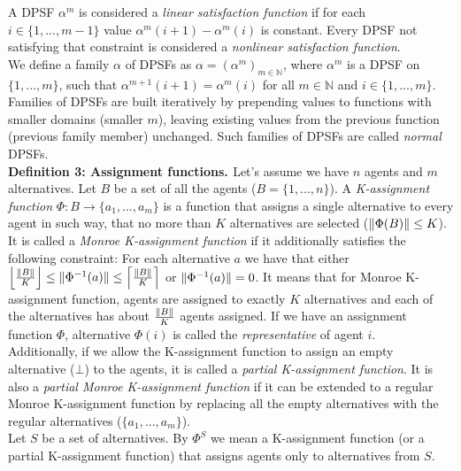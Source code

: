 A DPSF  $\alpha^{m}$ is considered a \textit{linear satisfaction function} if for each $i \in \{1,...,m-1\}$ value $\alpha^{m}(i+1) - \alpha^{m}(i)$ is constant. Every DPSF not satisfying that constraint is considered a \textit{nonlinear satisfaction function}.
\\

We define a family $\alpha$ of DPSFs as $\alpha = (\alpha^{m})_{m \in \mathbb{N}}$, where $\alpha^{m}$ is a DPSF on $\{1,...,m\}$, such that $\alpha^{m+1}(i+1) = \alpha^{m}(i)$ for all $m \in \mathbb{N}$ and $i \in \{1,...,m\}$. Families of DPSFs are built iteratively by prepending values to functions with smaller domains (smaller $m$), leaving existing values from the previous function (previous family member) unchanged. Such families of DPSFs are called \textit{normal} DPSFs.
\\

\noindent
\textbf{Definition 3: Assignment functions. \cite{1}} \hspace{.1in} Let's assume we have $n$ agents and $m$ alternatives. Let $B$ be a set of all the agents ($B = \{1,...,n\}$). A \textit{K-assignment function} $\Phi: B \rightarrow \{a_{1},...,a_{m}\}$ is a function that assigns a single alternative to every agent in such way, that no more than $K$ alternatives are selected ($\lVert\Phi(B)\rVert \leq K$). It is called a \textit{Monroe K-assignment function} if it additionally satisfies the following constraint: For each alternative $a$ we have that either $\left\lfloor \frac{\lVert B\rVert}{K} \right\rfloor \leq \lVert\Phi^{-1}(a)\rVert \leq \left\lceil \frac{\lVert B\rVert}{K} \right\rceil$ or $\lVert\Phi^{-1}(a)\rVert = 0$. It means that for Monroe K-assignment function, agents are assigned to exactly $K$ alternatives and each of the alternatives has about $\frac{\lVert B\rVert}{K}$ agents assigned. If we have an assignment function $\Phi$, alternative $\Phi(i)$ is called the \textit{representative} of agent $i$.
\\

Additionally, if we allow the K-assignment function to assign an empty alternative ($\bot$) to the agents, it is called a \textit{partial K-assignment function}. It is also a \textit{partial Monroe K-assignment function} if it can be extended to a regular Monroe K-assignment function by replacing all the empty alternatives with the regular alternatives ($\{a_{1},...,a_{m}\}$).
\\

Let $S$ be a set of alternatives. By $\Phi^{S}$ we mean a K-assignment function (or a partial K-assignment function) that assigns agents only to alternatives from $S$.
\\

